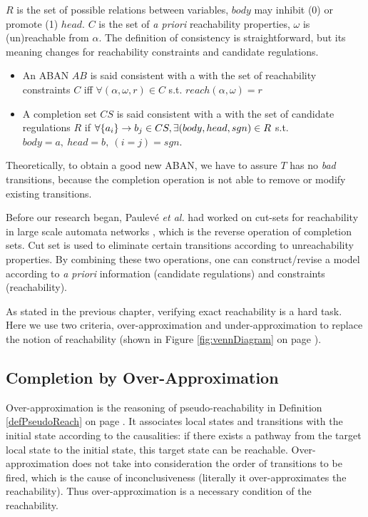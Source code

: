 $R$ is the set of possible relations between variables, $body$ may inhibit (0) or promote (1) $head$.
$C$ is the set of \textit{a priori} reachability properties, $\omega$ is (un)reachable from $\alpha$.
The definition of consistency is straightforward, but its meaning changes for reachability constraints and candidate regulations.

\begin{definition}[Consistency]
\leavevmode
\makeatletter
\@nobreaktrue
\makeatother
\begin{itemize}
    \item An ABAN $AB$ is said consistent with a with the set of reachability constraints $C$ iff $\forall (\alpha,\omega,r)\in C$ s.t. $reach(\alpha,\omega)=r$
    \item A completion set $CS$ is said consistent with a with the set of candidate regulations $R$ if $\forall \acm{a_i}{b_{1-j}}{b_j}\in CS, \exists (body,head,sgn)\in R$ s.t. $body=a,\ head=b,\ (i=j)=sgn$. 
\end{itemize}
    
\end{definition}
Theoretically, to obtain a good new ABAN, we have to assure $T$ has no \textit{bad} transitions, because the completion operation is not able to remove or modify existing transitions. 

Before our research began, Paulev\'e \textit{et al.} had worked on cut-sets for reachability in large scale automata networks \cite{PAK13-CAV}, which is the reverse operation of completion sets.
Cut set is used to eliminate certain transitions according to unreachability properties.
By combining these two operations, one can construct/revise a model according to \textit{a priori} information (candidate regulations) and constraints (reachability).

As stated in the previous chapter, verifying exact reachability is a hard task.
Here we use two criteria, over-approximation and under-approximation to replace the notion of reachability (shown in Figure \ref{fig:vennDiagram} on page \pageref{fig:vennDiagram}).


\subsection{Completion by Over-Approximation}
Over-approximation is the reasoning of pseudo-reachability in Definition \ref{defPseudoReach} on page \pageref{defPseudoReach}. 
It associates local states and transitions with the initial state according to the causalities: if there exists a pathway from the target local state to the initial state, this target state can be reachable.
Over-approximation does not take into consideration the order of transitions to be fired, which is the cause of inconclusiveness (literally it over-approximates the reachability).
Thus over-approximation is a necessary condition of the reachability.

